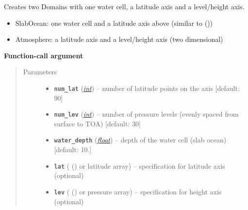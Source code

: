 \documentclass[a4paper,10pt,english]{sphinxmanual}
\begin{document}
\begin{fulllineitems}
\label{api/climlab.domain:climlab.domain.domain.zonal_mean_column}
Creates two Domains with one water cell, a latitude axis and 
a level/height axis.
\begin{itemize}
\item {} 
SlabOcean:    one water cell and a latitude axis above 
(similar to {\hyperref[api/climlab.domain:climlab.domain.domain.zonal_mean_surface]{\emph{}}} ())

\item {} 
Atmosphere: a latitude axis and a level/height axis (two dimensional)

\end{itemize}

\textbf{Function-call argument}
\begin{quote}\begin{description}
\item[{Parameters}] \leavevmode\begin{itemize}
\item {} 
\textbf{\texttt{num\_lat}} (\href{http://docs.python.org/2.7/library/functions.html\#int}{\emph{int}}) -- number of latitude points on the axis
{[}default: 90{]}

\item {} 
\textbf{\texttt{num\_lev}} (\href{http://docs.python.org/2.7/library/functions.html\#int}{\emph{int}}) -- number of pressure levels
(evenly spaced from surface to TOA) {[}default: 30{]}

\item {} 
\textbf{\texttt{water\_depth}} (\href{http://docs.python.org/2.7/library/functions.html\#float}{\emph{float}}) -- depth of the water cell (slab ocean) {[}default: 10.{]}

\item {} 
\textbf{\texttt{lat}} ({\hyperref[api/climlab.domain:climlab.domain.axis.Axis]{\emph{}}} () or latitude array) -- specification for latitude axis (optional)

\item {} 
\textbf{\texttt{lev}} ({\hyperref[api/climlab.domain:climlab.domain.axis.Axis]{\emph{}}} () or pressure array) -- specification for height axis (optional)


\end{itemize}
\end{description}
\end{quote}
\end{fulllineitems}
\end{document}
